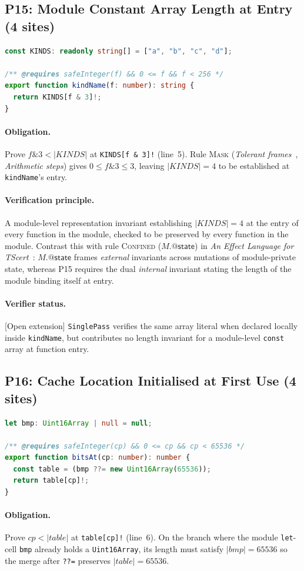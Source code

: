 \documentclass[10pt,a4paper]{article}
\makeatletter
\newcommand{\kw}[1]{\mathsf{#1}}
\newcommand{\len}[1]{|#1|}
\newcommand{\code}[1]{\textcolor{codec}{\texttt{#1}}}
\newcommand{\lean}[1]{\texttt{\small #1}}
\newcommand{\ruleName}[1]{\textcolor{rulec}{\textsc{#1}}}
\newcommand{\modstate}[1]{#1.{@\kw{state}}}
\newcommand{\statusc}[1]{\textcolor{conjc}{\textsf{\small[#1]}}}
\newcommand{\nI}[1]{\emph{Tolerant frames}~\cite{tf}, \emph{#1}}
\newcommand{\entry}[1]{\paragraph{#1.}}
\renewcommand{\lean}[1]{\textcolor{leanc}{\texttt{\small #1}}}%
\makeatother
\begin{document}
\subsection{P15: Module Constant Array Length at Entry (4 sites)}\label{sec:p15}

\begin{lstlisting}[language=TypeScript]
const KINDS: readonly string[] = ["a", "b", "c", "d"];

/** @requires safeInteger(f) && 0 <= f && f < 256 */
export function kindName(f: number): string {
  return KINDS[f & 3]!;
}
\end{lstlisting}

\entry{Obligation}
Prove $f\mathbin{\&}3<\len{\mathit{KINDS}}$ at \code{KINDS[f \& 3]!}
(line~5). Rule \ruleName{Mask} (\nI{Arithmetic steps}) gives
$0\le f\mathbin{\&}3\le 3$, leaving $\len{\mathit{KINDS}}=4$ to be
established at \code{kindName}'s entry.

\entry{Verification principle}
A module-level representation invariant establishing
$\len{\mathit{KINDS}}=4$ at the entry of every function in the module,
checked to be preserved by every function in the module. Contrast this
with rule \ruleName{Confined} ($\modstate{M}$) in \emph{An Effect
Language for TScert}~\cite{el}: $\modstate{M}$ frames \emph{external}
invariants across mutations of module-private state, whereas P15
requires the dual \emph{internal} invariant stating the length of the
module binding itself at entry.

\entry{Verifier status}
\statusc{Open extension} \lean{SinglePass} verifies the same array
literal when declared locally inside \code{kindName}, but contributes no
length invariant for a module-level \code{const} array at function
entry.

\subsection{P16: Cache Location Initialised at First Use (4 sites)}\label{sec:p16}

\begin{lstlisting}[language=TypeScript]
let bmp: Uint16Array | null = null;

/** @requires safeInteger(cp) && 0 <= cp && cp < 65536 */
export function bitsAt(cp: number): number {
  const table = (bmp ??= new Uint16Array(65536));
  return table[cp]!;
}
\end{lstlisting}

\entry{Obligation}
Prove $\mathit{cp}<\len{\mathit{table}}$ at \code{table[cp]!} (line~6).
On the branch where the module \code{let}-cell \code{bmp} already holds
a \code{Uint16Array}, its length must satisfy $\len{\mathit{bmp}}=65536$
so the merge after \code{??=} preserves $\len{\mathit{table}}=65536$.
\end{document}
